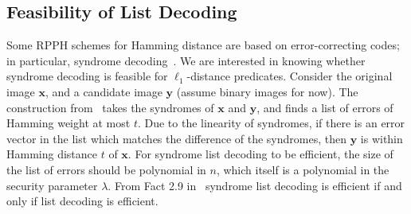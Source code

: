 \documentclass[pdflatex,sn-mathphys-num]{sn-jnl}
\theoremstyle{definition}
\newcommand{\vtr}[1]{\mathbf{#1}}
\begin{document}

\subsection{Feasibility of List Decoding}
\label{subsec:feasibility}
Some RPPH schemes for Hamming distance are based on error-correcting codes; in particular, syndrome decoding~\cite{holmgren2022nearly}. We are interested in knowing whether syndrome decoding is feasible for $\ell_1$-distance predicates. Consider the original image $\vtr{x}$, and a candidate image $\vtr{y}$ (assume binary images for now). The construction from~\cite{holmgren2022nearly} takes the syndromes of $\vtr{x}$ and $\vtr{y}$, and finds a list of errors of Hamming weight at most $t$. Due to the linearity of syndromes, if there is an error vector in the list which matches the difference of the syndromes, then $\vtr{y}$ is within Hamming distance $t$ of $\vtr{x}$. For syndrome list decoding to be efficient, the size of the list of errors should be polynomial in $n$, which itself is a polynomial in the security parameter $\lambda$. From Fact 2.9 in~\cite{holmgren2022nearly} syndrome list decoding is efficient if and only if list decoding is efficient. 
\end{document}

